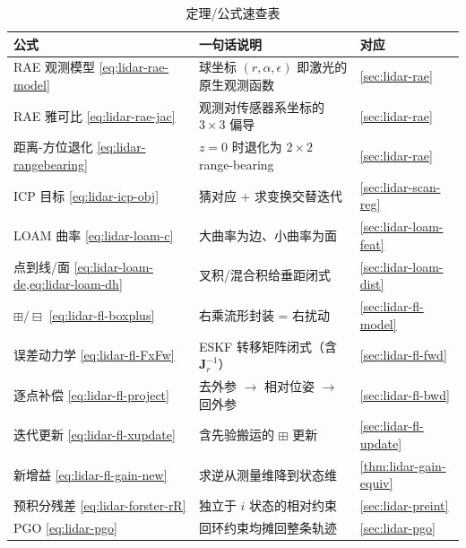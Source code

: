 \begin{table}[H]\centering\small
\caption{定理/公式速查表}
\begin{tabular}{lll}
\toprule
公式 & 一句话说明 & 对应 \\
\midrule
RAE 观测模型 \cref{eq:lidar-rae-model} & 球坐标 $(r,\alpha,\epsilon)$ 即激光的原生观测函数 & \cref{sec:lidar-rae} \\
RAE 雅可比 \cref{eq:lidar-rae-jac} & 观测对传感器系坐标的 $3\times3$ 偏导 & \cref{sec:lidar-rae} \\
距离-方位退化 \cref{eq:lidar-rangebearing} & $z=0$ 时退化为 $2\times2$ range-bearing & \cref{sec:lidar-rae} \\
ICP 目标 \cref{eq:lidar-icp-obj} & 猜对应 + 求变换交替迭代 & \cref{sec:lidar-scan-reg} \\
LOAM 曲率 \cref{eq:lidar-loam-c} & 大曲率为边、小曲率为面 & \cref{sec:lidar-loam-feat} \\
点到线/面 \cref{eq:lidar-loam-de,eq:lidar-loam-dh} & 叉积/混合积给垂距闭式 & \cref{sec:lidar-loam-dist} \\
$\boxplus/\boxminus$ \cref{eq:lidar-fl-boxplus} & 右乘流形封装 = 右扰动 & \cref{sec:lidar-fl-model} \\
误差动力学 \cref{eq:lidar-fl-FxFw} & ESKF 转移矩阵闭式（含 $\mathbf{J}_r^{-1}$） & \cref{sec:lidar-fl-fwd} \\
逐点补偿 \cref{eq:lidar-fl-project} & 去外参 $\to$ 相对位姿 $\to$ 回外参 & \cref{sec:lidar-fl-bwd} \\
迭代更新 \cref{eq:lidar-fl-xupdate} & 含先验搬运的 $\boxplus$ 更新 & \cref{sec:lidar-fl-update} \\
新增益 \cref{eq:lidar-fl-gain-new} & 求逆从测量维降到状态维 & \cref{thm:lidar-gain-equiv} \\
预积分残差 \cref{eq:lidar-forster-rR} & 独立于 $i$ 状态的相对约束 & \cref{sec:lidar-preint} \\
PGO \cref{eq:lidar-pgo} & 回环约束均摊回整条轨迹 & \cref{sec:lidar-pgo} \\
\bottomrule
\end{tabular}
\end{table}

